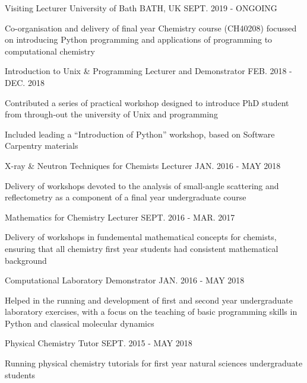\begin{cventries}
	\cventry
	{Visiting Lecturer}
	{University of Bath}
	{BATH, UK}
	{SEPT. 2019 - ONGOING}
	{
		\begin{cvitems}
			\item {Co-organisation and delivery of final year Chemistry course (CH40208) focussed on introducing Python programming and applications of programming to computational chemistry}
		\end{cvitems}
	}
	\cventry
	{Introduction to Unix \& Programming Lecturer and Demonstrator}
	{}
	{}
	{FEB. 2018 - DEC. 2018}
	{
		\begin{cvitems}
			\item {Contributed a series of practical workshop designed to introduce PhD student from through-out the university of Unix and programming}
			\item {Included leading a ``Introduction of Python'' workshop, based on Software Carpentry materials}
		\end{cvitems}
	}
	\cventry
	{X-ray \& Neutron Techniques for Chemists Lecturer}
	{}
	{}
	{JAN. 2016 - MAY 2018}
	{
		\begin{cvitems}
			\item {Delivery of workshops devoted to the analysis of small-angle scattering and reflectometry as a component of a final year undergraduate course}
		\end{cvitems}
	}
	\cventry
	{Mathematics for Chemistry Lecturer}
	{}
	{}
	{SEPT. 2016 - MAR. 2017}
	{
		\begin{cvitems}
			\item {Delivery of workshops in fundemental mathematical concepts for chemists, ensuring that all chemistry first year students had consistent mathematical background}
		\end{cvitems}
	}
	\cventry
	{Computational Laboratory Demonstrator}
	{}
	{}
	{JAN. 2016 - MAY 2018}
	{
		\begin{cvitems}
			\item {Helped in the running and development of first and second year undergraduate laboratory exercises, with a focus on the teaching of basic programming skills in Python and classical molecular dynamics}
		\end{cvitems}
	}
	\cventry
	{Physical Chemistry Tutor}
	{}
	{}
	{SEPT. 2015 - MAY 2018}
	{
		\begin{cvitems}
			\item {Running physical chemistry tutorials for first year natural sciences undergraduate students}

\end{cvitems}}
\end{cventries}
